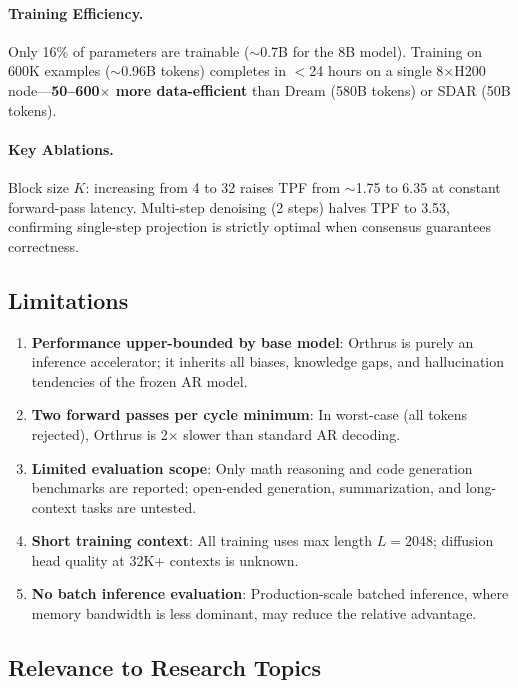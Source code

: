 \documentclass[11pt,a4paper]{article}
\begin{document}
\paragraph{Training Efficiency.} Only 16\% of parameters are trainable (${\sim}$0.7B for the 8B model). Training on 600K examples (${\sim}$0.96B tokens) completes in $<$24 hours on a single 8$\times$H200 node---\textbf{50--600$\times$ more data-efficient} than Dream (580B tokens) or SDAR (50B tokens).

\paragraph{Key Ablations.} Block size $K$: increasing from 4 to 32 raises TPF from ${\sim}$1.75 to 6.35 at constant forward-pass latency. Multi-step denoising (2 steps) halves TPF to 3.53, confirming single-step projection is strictly optimal when consensus guarantees correctness.

\subsection{Limitations}

\begin{enumerate}[nosep]
\item \textbf{Performance upper-bounded by base model}: Orthrus is purely an inference accelerator; it inherits all biases, knowledge gaps, and hallucination tendencies of the frozen AR model.
\item \textbf{Two forward passes per cycle minimum}: In worst-case (all tokens rejected), Orthrus is 2$\times$ slower than standard AR decoding.
\item \textbf{Limited evaluation scope}: Only math reasoning and code generation benchmarks are reported; open-ended generation, summarization, and long-context tasks are untested.
\item \textbf{Short training context}: All training uses max length $L{=}2048$; diffusion head quality at 32K+ contexts is unknown.
\item \textbf{No batch inference evaluation}: Production-scale batched inference, where memory bandwidth is less dominant, may reduce the relative advantage.
\end{enumerate}

\subsection{Relevance to Research Topics}
\end{document}
